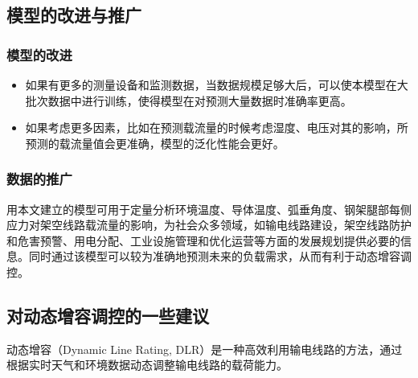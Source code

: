 \documentclass[withoutpreface,bwprint]{cumcmthesis}  %
\begin{document}
	\subsection{模型的改进与推广}

	\subsubsection{模型的改进}
            \begin{itemize}
                \item 如果有更多的测量设备和监测数据，当数据规模足够大后，可以使本模型在大批次数据中进行训练，使得模型在对预测大量数据时准确率更高。
                \item 如果考虑更多因素，比如在预测载流量的时候考虑湿度、电压对其的影响，所预测的载流量值会更准确，模型的泛化性能会更好。
            \end{itemize}
	
	\subsubsection{数据的推广}
	用本文建立的模型可用于定量分析环境温度、导体温度、弧垂角度、钢架腿部每侧应力对架空线路载流量的影响，为社会众多领域，如输电线路建设，架空线路防护和危害预警、用电分配、工业设施管理和优化运营等方面的发展规划提供必要的信息。同时通过该模型可以较为准确地预测未来的负载需求，从而有利于动态增容调控。

	\subsection{对动态增容调控的一些建议}
        动态增容（Dynamic Line Rating, DLR）是一种高效利用输电线路的方法，通过根据实时天气和环境数据动态调整输电线路的载荷能力。
        
\end{document}

